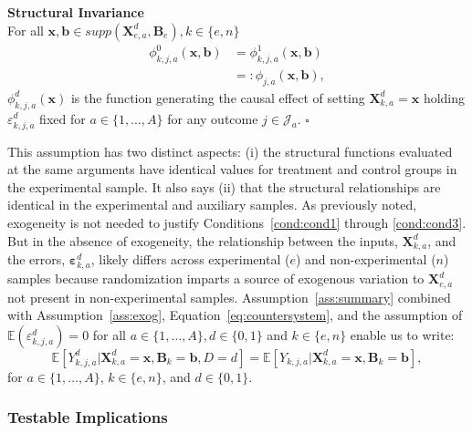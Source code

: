 \onehalfspacing
\begin{assumption} \label{ass:summary} \textbf{Structural Invariance}\\
For all $\bm{x}, \bm{b} \in supp(\bm{X}^d_{e,a}, \bm{B}_e), k \in \{e,n\}$
\begin{align}
\phi_{k,j,a}^0 \left( \bm{x}, \bm{b} \right) &= \phi_{k,j,a}^1 (\bm{x}, \bm{b}) \\   \nonumber
                                                                     &=: \phi_{j,a} (\bm{x}, \bm{b}),
\end{align}
$\phi^d_{k,j,a}(\bm{x})$ is the function generating the causal effect of setting $\bm{X}^d_{k,a}=\bm{x}$ holding $\varepsilon^d_{k,j,a}$ fixed for $a \in \{1,\dots,A\}$ for any outcome $j \in \mathcal{J}_{a}$. $\square$
\end{assumption}
\doublespacing

This assumption has two distinct aspects: (i) the structural functions evaluated at the same arguments have identical values for treatment and control groups in the experimental sample. It also says (ii) that the structural relationships are identical in the experimental and auxiliary samples. As previously noted, exogeneity is not needed to justify Conditions~\ref{cond:cond1} through \ref{cond:cond3}. But in the absence of exogeneity, the relationship between the inputs, $\bm{X}^d_{k,a}$, and the errors, $\bm{\varepsilon}^d_{k,a}$, likely differs across experimental ($e$) and non-experimental ($n$) samples because randomization imparts a source of exogenous variation to $\bm{X}^d_{e,a}$ not present in non-experimental samples. Assumption~\ref{ass:summary} combined with Assumption~\ref{ass:exog}, Equation~\eqref{eq:countersystem}, and the assumption of $\mathbb{E}(\varepsilon^d_{k,j,a})=0$ for all $a \in \{1,\dots,A\}, d \in \{0,1\}$ and $k \in \{e,n\}$ enable us to write:
\begin{equation}\label{eq:invariancetest}
\mathbb{E} \left[ Y_{k,j,a}^d | \bm{X}_{k,a}^d  = \bm{x}, \bm{B}_k = \bm{b}, D = d \right] = \mathbb{E} \left[ Y_{k,j,a} | \bm{X}^d_{k,a}  = \bm{x}, \bm{B}_k = \bm{b} \right],
\end{equation}
for $a \in \{1,\dots,A\}$, $k \in \{e,n\}$, and $d \in \{0,1\}$.

\subsubsection{Testable Implications}

